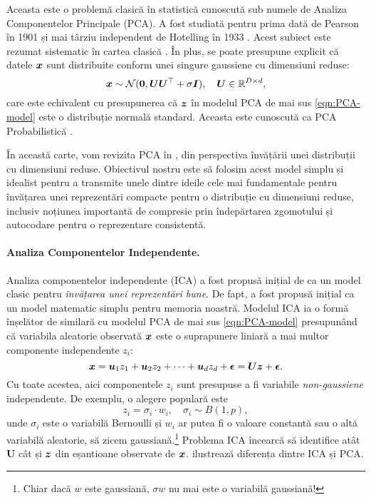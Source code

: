 \documentclass[../../book-main_ro.tex]{subfiles}
\begin{document}
Aceasta este o problemă clasică în statistică cunoscută sub numele de Analiza Componentelor Principale (PCA). A fost studiată pentru prima dată de Pearson în 1901 \cite{Pearson1901} și mai târziu independent de Hotelling în 1933 \cite{Hotelling1933}. Acest subiect este rezumat sistematic în cartea clasică \cite{Jolliffe1986,JolliffeI2002}.
În plus, se poate presupune explicit că datele $\bm{x}$ sunt distribuite conform unei singure gaussiene cu dimensiuni reduse:
\begin{equation}
    \bm{x} \sim \mathcal{N}(\boldsymbol{0}, \boldsymbol{U}\boldsymbol{U}^\top + \sigma \bm{I}), \quad \boldsymbol{U} \in \mathbb{R}^{D\times d},
\end{equation}
care este echivalent cu presupunerea că $\bm{z}$ în modelul PCA de mai sus \eqref{eqn:PCA-model} este o distribuție normală standard.
Aceasta este cunoscută ca PCA Probabilistică \cite{TippingM1999}.

În această carte, vom revizita PCA în , din perspectiva învățării unei distribuții cu dimensiuni reduse. Obiectivul nostru este să folosim acest model simplu și idealist pentru a transmite unele dintre ideile cele mai fundamentale pentru învățarea unei reprezentări compacte pentru o distribuție cu dimensiuni reduse, inclusiv noțiunea importantă de compresie prin îndepărtarea zgomotului și autocodare pentru o reprezentare consistentă.

\paragraph{Analiza Componentelor Independente.}
Analiza componentelor independente (ICA) a fost propusă inițial de \cite{Ans-1985} ca un model clasic pentru {\em învățarea unei reprezentări bune}. De fapt, a fost propusă inițial ca un model matematic simplu pentru memoria noastră. Modelul ICA ia o formă înșelător de similară cu modelul PCA de mai sus \eqref{eqn:PCA-model} presupunând că variabila aleatorie observată $\bm{x}$ este o suprapunere liniară a mai multor componente independente $z_i$:
\begin{equation}
    \bm{x} = \boldsymbol{u}_1 z_1 + \boldsymbol{u}_2 z_2 + \cdots + \boldsymbol{u}_d z_d  + \boldsymbol{\epsilon} =  \boldsymbol{U} \bm{z} + \boldsymbol{\epsilon}.
    \label{eqn:ICA-model}
\end{equation}
Cu toate acestea, aici componentele $z_i$ sunt presupuse a fi variabile {\em non-gaussiene} independente. De exemplu, o alegere populară este
\begin{equation}
    z_i = \sigma_i \cdot w_i, \quad \sigma_i \sim B(1,p),
    \label{eqn:ICA-modes}
\end{equation}
unde $\sigma_i$ este o variabilă Bernoulli și $w_i$ ar putea fi o valoare constantă sau o altă variabilă aleatorie, să zicem gaussiană.\footnote{Chiar dacă $w$ este gaussiană, $\sigma w$ nu mai este o variabilă gaussiană!} Problema ICA încearcă să identifice atât $\boldsymbol{U}$ cât și $\bm{z}$ din eșantioane observate de $\bm{x}$.  ilustrează diferența dintre ICA și PCA.
\end{document}
